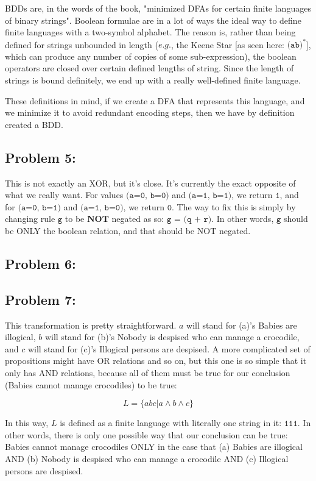 \documentclass[a4paper]{article}
\begin{document}
BDDs are, in the words of the book, "minimized DFAs for certain finite languages of binary strings". Boolean formulae are in a lot of ways the ideal way to define finite languages with a two-symbol alphabet. The reason is, rather than being defined for strings unbounded in length ($\textit{e.g.}$, the Keene Star [as seen here: $\texttt{(ab)}^*$], which can produce any number of copies of some sub-expression), the boolean operators are closed over certain defined lengths of string. Since the length of strings is bound definitely, we end up with a really well-defined finite language.

These definitions in mind, if we create a DFA that represents this language, and we minimize it to avoid redundant encoding steps, then we have by definition created a BDD.

\subsection*{Problem 5:}

This is not exactly an XOR, but it's close. It's currently the exact opposite of what we really want. For values $\texttt{(a=0, b=0)}$ and $\texttt{(a=1, b=1)}$, we return $\texttt{1}$, and for $\texttt{(a=0, b=1)}$ and $\texttt{(a=1, b=0)}$, we return $\texttt{0}$. The way to fix this is simply by changing rule $\texttt{g}$ to be $\textbf{NOT}$ negated as so: $\texttt{g = (q + r)}$. In other words, $\texttt{g}$ should be ONLY the boolean relation, and that should be NOT negated.

\subsection*{Problem 6:}

\subsection*{Problem 7:} This transformation is pretty straightforward. $a$ will stand for (a)'s Babies are illogical, $b$ will stand for (b)'s Nobody is despised who can manage a crocodile, and $c$ will stand for (c)'s Illogical persons are despised. A more complicated set of propositions might have OR relations and so on, but this one is so simple that it only has AND relations, because all of them must be true for our conclusion (Babies cannot manage crocodiles) to be true:

\begin{equation}
L = \{ abc | a \wedge b \wedge c \}
\end{equation}

In this way, $L$ is defined as a finite language with literally one string in it: $\texttt{111}$. In other words, there is only one possible way that our conclusion can be true: Babies cannot manage crocodiles ONLY in the case that (a) Babies are illogical AND (b) Nobody is despised who can manage a crocodile AND (c) Illogical persons are despised.
\end{document}
